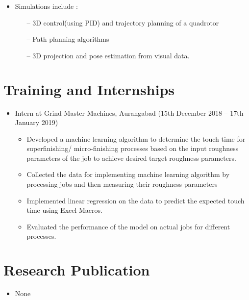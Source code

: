 \documentclass[margin,line]{res}
\begin{document}
\begin{resume}
\begin{enumerate}
\begin{itemize}
		\item Simulations include :
		\begin{itemize}
			\item[--] 3D control(using PID) and trajectory planning of a quadrotor
			\item[--] Path planning algorithms 
			\item[--] 3D projection and pose estimation from visual data.
		\end{itemize}
	\end{itemize}
\end{enumerate}

\section{\sc Training and Internships}
\begin{itemize}
\item Intern at Grind Master Machines, Aurangabad (15th December 2018 – 17th January 2019)
\begin{itemize}
	\item Developed a machine learning algorithm to determine the touch time for superfinishing/ micro-finishing processes based 				on the input roughness parameters of the job to achieve desired target roughness parameters.
	\item Collected the data for implementing machine learning algorithm by processing jobs and then measuring their roughness 				parameters
	\item Implemented linear regression on the data to predict the expected touch time using Excel Macros.
	\item Evaluated the performance of the model on actual jobs for different processes.
\end{itemize}
\end{itemize}

\section{\sc Research Publication}
\begin{itemize}
	\item None
\end{itemize}


\end{resume}
\end{document}
